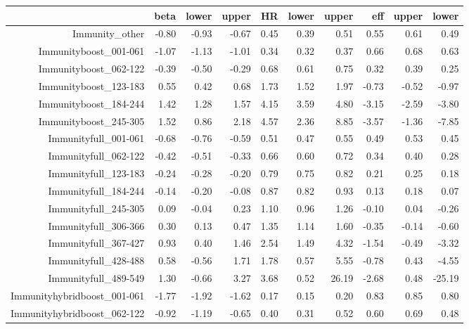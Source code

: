 \begin{table}[ht]
\centering
\begin{tabular}{rrrrrrrrrr}
  \hline
 & beta & lower & upper & HR & lower & upper & eff & upper & lower \\ 
  \hline
Immunity\_other & -0.80 & -0.93 & -0.67 & 0.45 & 0.39 & 0.51 & 0.55 & 0.61 & 0.49 \\ 
  Immunityboost\_001-061 & -1.07 & -1.13 & -1.01 & 0.34 & 0.32 & 0.37 & 0.66 & 0.68 & 0.63 \\ 
  Immunityboost\_062-122 & -0.39 & -0.50 & -0.29 & 0.68 & 0.61 & 0.75 & 0.32 & 0.39 & 0.25 \\ 
  Immunityboost\_123-183 & 0.55 & 0.42 & 0.68 & 1.73 & 1.52 & 1.97 & -0.73 & -0.52 & -0.97 \\ 
  Immunityboost\_184-244 & 1.42 & 1.28 & 1.57 & 4.15 & 3.59 & 4.80 & -3.15 & -2.59 & -3.80 \\ 
  Immunityboost\_245-305 & 1.52 & 0.86 & 2.18 & 4.57 & 2.36 & 8.85 & -3.57 & -1.36 & -7.85 \\ 
  Immunityfull\_001-061 & -0.68 & -0.76 & -0.59 & 0.51 & 0.47 & 0.55 & 0.49 & 0.53 & 0.45 \\ 
  Immunityfull\_062-122 & -0.42 & -0.51 & -0.33 & 0.66 & 0.60 & 0.72 & 0.34 & 0.40 & 0.28 \\ 
  Immunityfull\_123-183 & -0.24 & -0.28 & -0.20 & 0.79 & 0.75 & 0.82 & 0.21 & 0.25 & 0.18 \\ 
  Immunityfull\_184-244 & -0.14 & -0.20 & -0.08 & 0.87 & 0.82 & 0.93 & 0.13 & 0.18 & 0.07 \\ 
  Immunityfull\_245-305 & 0.09 & -0.04 & 0.23 & 1.10 & 0.96 & 1.26 & -0.10 & 0.04 & -0.26 \\ 
  Immunityfull\_306-366 & 0.30 & 0.13 & 0.47 & 1.35 & 1.14 & 1.60 & -0.35 & -0.14 & -0.60 \\ 
  Immunityfull\_367-427 & 0.93 & 0.40 & 1.46 & 2.54 & 1.49 & 4.32 & -1.54 & -0.49 & -3.32 \\ 
  Immunityfull\_428-488 & 0.58 & -0.56 & 1.71 & 1.78 & 0.57 & 5.55 & -0.78 & 0.43 & -4.55 \\ 
  Immunityfull\_489-549 & 1.30 & -0.66 & 3.27 & 3.68 & 0.52 & 26.19 & -2.68 & 0.48 & -25.19 \\ 
  Immunityhybridboost\_001-061 & -1.77 & -1.92 & -1.62 & 0.17 & 0.15 & 0.20 & 0.83 & 0.85 & 0.80 \\ 
  Immunityhybridboost\_062-122 & -0.92 & -1.19 & -0.65 & 0.40 & 0.31 & 0.52 & 0.60 & 0.69 & 0.48 \\ 

\end{tabular}
\end{table}
